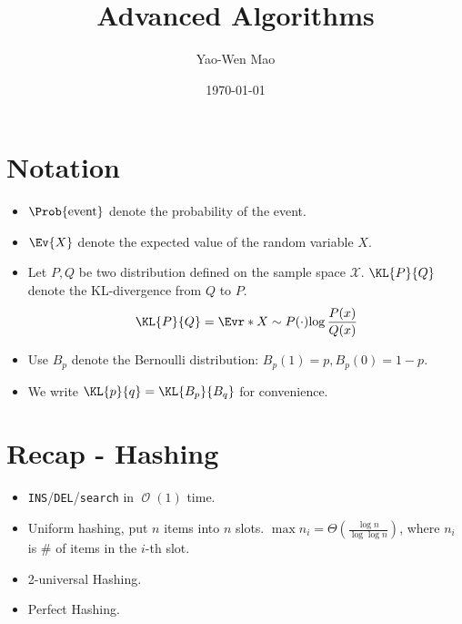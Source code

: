 \documentclass[a4paper]{article}
\title{Advanced Algorithms}
\author{Yao-Wen Mao}
\date{\today}
\newcommand*{\Xc}{\mathcal{X}}
\DeclareMathOperator{\Ord}{\mathcal{O}}
\theoremstyle{mystyle}
\begin{document}
\maketitle
\section*{Notation}
\begin{itemize}
  \item $\Prob{ \text{event} }$ denote the probability of the event.
  \item $\Ev{X}$ denote the expected value of the random variable $X$.
  \item Let $P, Q$ be two distribution defined on the sample space $\Xc$.
    $\KL{P}{Q}$ denote the KL-divergence from $Q$ to $P$.
    \[
      \KL{P}{Q} = \Evr*{X \sim P(\cdot)}{\log \frac{P(x)}{Q(x)}}
    \]
  \item Use $B_p$ denote the Bernoulli distribution:
    $ B_p(1) = p, B_p(0) = 1 - p. $
  \item We write $\KL{p}{q} = \KL{B_p}{B_q}$ for convenience.
\end{itemize}

\setcounter{section}{-1}
\section{Recap - Hashing}
\begin{itemize}
  \item {\tt INS}/{\tt DEL}/{\tt search} in $\Ord(1)$ time.
  \item Uniform hashing, put $n$ items into $n$ slots.
    $\max n_i = \Theta\left( \frac{\log n}{\log \log n} \right)$,
    where $n_i$ is \# of items in the $i$-th slot.
  \item 2-universal Hashing.
  \item Perfect Hashing.
\end{itemize}
\end{document}
